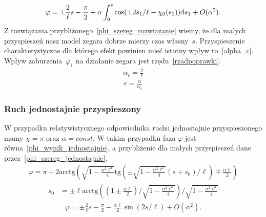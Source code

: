 \begin{align}\label{phi_szereg_rozwiazanie}
\varphi =  \pm \frac{2}{\ell}s - \frac{\pi}{2} 
+\alpha  \int_0^s \cos (\pm 2 s_1 / \ell  - \chi_0(s_1)  ) \text{d} s_1 
+O(\alpha^2).
\end{align}
Z rozwiązania przybliżonego~\eqref{phi_szereg_rozwiazanie} 
wiemy, że dla małych przyspieszeń nasz model zegara dobrze 
mierzy czas własny~$s$. Przyspieszenie charakterystyczne dla 
którego efekt powinien mieć istotny wpływ to~\eqref{alpha_c}.
Wpływ zaburzenia~$\varphi_1$ na działanie zegara jest 
rzędu~\eqref{rzadpoprawki}.
\begin{align}\label{alpha_c}
\alpha_c = \frac{2}{\ell}
\end{align}
\begin{align}\label{rzadpoprawki}
\epsilon = \frac{\alpha}{\alpha_c}
\end{align}

\subsubsection{Ruch jednostajnie przyspieszony}
W przypadku relatywistycznego odpowiednika ruchu jednostajnie 
przyspieszonego mamy $\chi = \pi$ oraz $\alpha = const$.
W takim przypadku faza $\varphi$ jest 
równa~\eqref{phi_wynik_jednostajnie}, a 
przybliżenie dla małych przyspieszeń dane 
przez~\eqref{phi_szereg_jednostajnie}.
\begin{align}\label{phi_wynik_jednostajnie}
\varphi = \pi + 
2\text{arctg} \left( 
\sqrt{1-\frac{\alpha^2\ell^2}{4}} 
\text{tg} \left( \pm 
\sqrt{1-\frac{\alpha^2\ell^2}{4}} 
(s + s_0)/\ell\right)  \mp \frac{\alpha \ell}{2}
\right)
\end{align}
\begin{align*}
s_0 & = \pm \ell \text{arctg}  
\left( \left(1 \pm\frac{\alpha\ell}{2}\right) \Big / 
\sqrt{1-\frac{\alpha^2\ell^2}{4}}  \right)
\Big /\sqrt{1-\frac{\alpha^2\ell^2}{4}}
\end{align*}
\begin{align}\label{phi_szereg_jednostajnie}
\varphi =  \pm \frac{2}{\ell}s - \frac{\pi}{2} 
- \frac{\alpha \ell}{2}  \sin (2 s / \ell  )  
+O(\alpha^2).
\end{align}
